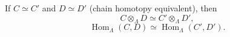 If $C \simeq C'$ and $D \simeq D'$ (chain homotopy equivalent), then
$$C \otimes_{\Lambda} D \simeq C' \otimes_{\Lambda} D',$$
$$\operatorname{Hom}_{\Lambda}(C, D) \simeq \operatorname{Hom}_{\Lambda}(C', D').$$

